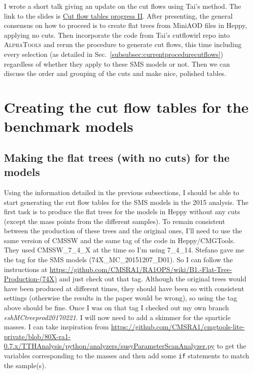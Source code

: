 I wrote a short talk giving an update on the cut flows using Tai's method. The link to the slides is \href{run:sec18/Cut flow tables progress II.pdf}{Cut flow tables progress II}. After presenting, the general consensus on how to proceed is to create flat trees from MiniAOD files in Heppy, applying no cuts. Then incorporate the code from Tai's cutflowirl repo into \textsc{AlphaTools} and rerun the procedure to generate cut flows, this time including every selection (as detailed in Sec.~\ref{subsubsec:currentprocedurecutflows}) regardless of whether they apply to these SMS models or not. Then we can discuss the order and grouping of the cuts and make nice, polished tables.

\section{Creating the cut flow tables for the benchmark models}

\subsection{Making the flat trees (with no cuts) for the models}

Using the information detailed in the previous subsections, I should be able to start generating the cut flow tables for the SMS models in the 2015 analysis. The first task is to produce the flat trees for the models in Heppy without any cuts (except the mass points from the different samples). To remain consistent between the production of these trees and the original ones, I'll need to use the same version of CMSSW and the same tag of the code in Heppy/CMGTools. They used CMSSW\_7\_4\_X at the time so I'm using 7\_4\_14. Stefano gave me the tag for the SMS models (74X\_MC\_20151207\_D01). So I can follow the instructions at \url{https://github.com/CMSRA1/RA1OPS/wiki/B1.-Flat-Tree-Production-(74X)} and just check out that tag. Although the original trees would have been produced at different times, they should have been so with consistent settings (otherwise the results in the paper would be wrong), so using the tag above should be fine. Once I was on that tag I checked out my own branch \emph{eshMCtreeprod20170221}. I will now need to add a skimmer for the sparticle masses. I can take inspiration from \url{https://github.com/CMSRA1/cmgtools-lite-private/blob/80X-ra1-0.7.x/TTHAnalysis/python/analyzers/susyParameterScanAnalyzer.py} to get the variables corresponding to the masses and then add some \verb!if! statements to match the sample(s).

